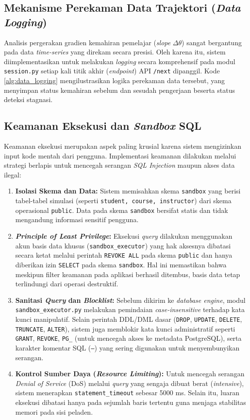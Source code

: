 \subsection{Mekanisme Perekaman Data Trajektori (\textit{Data Logging})}
Analisis pergerakan gradien kemahiran pemelajar (\textit{slope} $\Delta\theta$) sangat bergantung pada data \textit{time-series} yang direkam secara presisi. Oleh karena itu, sistem diimplementasikan untuk melakukan \textit{logging} secara komprehensif pada modul \texttt{session.py} setiap kali titik akhir (\textit{endpoint}) API \texttt{/next} dipanggil. Kode \ref{alg:data_logging} mengilustrasikan logika perekaman data tersebut, yang menyimpan status kemahiran sebelum dan sesudah pengerjaan beserta status deteksi stagnasi.



\subsection{Keamanan Eksekusi dan \textit{Sandbox} SQL}
Keamanan eksekusi merupakan aspek paling krusial karena sistem mengizinkan input kode mentah dari pengguna. Implementasi keamanan dilakukan melalui strategi berlapis untuk mencegah serangan \textit{SQL Injection} maupun akses data ilegal:
\begin{enumerate}
    \item \textbf{Isolasi Skema dan Data:} Sistem memisahkan skema \texttt{sandbox} yang berisi tabel-tabel simulasi (seperti \texttt{student, course, instructor}) dari skema operasional \texttt{public}. Data pada skema \texttt{sandbox} bersifat statis dan tidak mengandung informasi sensitif pengguna.
    \item \textbf{\textit{Principle of Least Privilege}:} Eksekusi \textit{query} dilakukan menggunakan akun basis data khusus (\texttt{sandbox\_executor}) yang hak aksesnya dibatasi secara ketat melalui perintah \texttt{REVOKE ALL} pada skema \texttt{public} dan hanya diberikan izin \texttt{SELECT} pada skema \texttt{sandbox}. Hal ini memastikan bahwa meskipun filter keamanan pada aplikasi berhasil ditembus, basis data tetap terlindungi dari operasi destruktif.
    \item \textbf{Sanitasi \textit{Query} dan \textit{Blocklist}:} Sebelum dikirim ke \textit{database engine}, modul \texttt{sandbox\_executor.py} melakukan pemindaian \textit{case-insensitive} terhadap kata kunci manipulatif. Selain perintah DDL/DML dasar (\texttt{DROP}, \texttt{UPDATE}, \texttt{DELETE}, \texttt{TRUNCATE}, \texttt{ALTER}), sistem juga memblokir kata kunci administratif seperti \texttt{GRANT}, \texttt{REVOKE}, \texttt{PG\_} (untuk mencegah akses ke metadata PostgreSQL), serta karakter komentar SQL (\texttt{--}) yang sering digunakan untuk menyembunyikan serangan.
    \item \textbf{Kontrol Sumber Daya (\textit{Resource Limiting}):} Untuk mencegah serangan \textit{Denial of Service} (DoS) melalui \textit{query} yang sengaja dibuat berat (\textit{intensive}), sistem menerapkan \texttt{statement\_timeout} sebesar 5000 ms. Selain itu, luaran eksekusi dibatasi hanya pada sejumlah baris tertentu guna menjaga stabilitas memori pada sisi peladen.
\end{enumerate}

